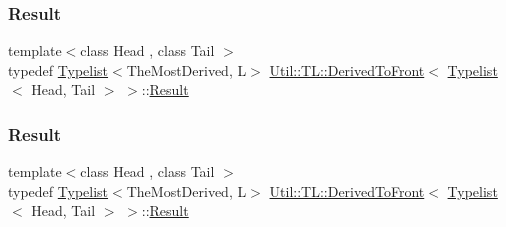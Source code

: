 \subsubsection{\texorpdfstring{Result}{Result}\hspace{0.1cm}{\footnotesize\ttfamily [1/3]}}
{\footnotesize\ttfamily template$<$class Head , class Tail $>$ \\
typedef \mbox{\hyperlink{structUtil_1_1Typelist}{Typelist}}$<$The\+Most\+Derived, L$>$ \mbox{\hyperlink{structUtil_1_1TL_1_1DerivedToFront}{Util\+::\+T\+L\+::\+Derived\+To\+Front}}$<$ \mbox{\hyperlink{structUtil_1_1Typelist}{Typelist}}$<$ Head, Tail $>$ $>$\+::\mbox{\hyperlink{structUtil_1_1TL_1_1DerivedToFront_3_01Typelist_3_01Head_00_01Tail_01_4_01_4_ae5fcbfce9e50c52c4c5cfe7626e32ddd}{Result}}}

\mbox{\label{structUtil_1_1TL_1_1DerivedToFront_3_01Typelist_3_01Head_00_01Tail_01_4_01_4_ae5fcbfce9e50c52c4c5cfe7626e32ddd}} 
\subsubsection{\texorpdfstring{Result}{Result}\hspace{0.1cm}{\footnotesize\ttfamily [2/3]}}
{\footnotesize\ttfamily template$<$class Head , class Tail $>$ \\
typedef \mbox{\hyperlink{structUtil_1_1Typelist}{Typelist}}$<$The\+Most\+Derived, L$>$ \mbox{\hyperlink{structUtil_1_1TL_1_1DerivedToFront}{Util\+::\+T\+L\+::\+Derived\+To\+Front}}$<$ \mbox{\hyperlink{structUtil_1_1Typelist}{Typelist}}$<$ Head, Tail $>$ $>$\+::\mbox{\hyperlink{structUtil_1_1TL_1_1DerivedToFront_3_01Typelist_3_01Head_00_01Tail_01_4_01_4_ae5fcbfce9e50c52c4c5cfe7626e32ddd}{Result}}}

\mbox{\label{structUtil_1_1TL_1_1DerivedToFront_3_01Typelist_3_01Head_00_01Tail_01_4_01_4_ae5fcbfce9e50c52c4c5cfe7626e32ddd}} 
